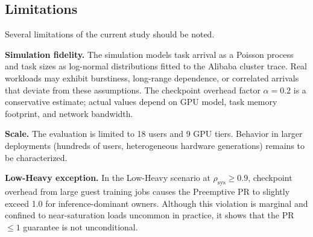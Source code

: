 \subsection{Limitations}
\label{sec:limitations}


Several limitations of the current study should be noted.


\textbf{Simulation fidelity.}
The simulation models task arrival as a Poisson process and task sizes
as log-normal distributions fitted to the Alibaba cluster trace.
Real workloads may exhibit burstiness, long-range dependence, or
correlated arrivals that deviate from these assumptions.
The checkpoint overhead factor $\alpha = 0.2$ is a conservative estimate;
actual values depend on GPU model, task memory footprint, and network bandwidth.


\textbf{Scale.}
The evaluation is limited to 18 users and 9 GPU tiers.
Behavior in larger deployments (hundreds of users, heterogeneous hardware
generations) remains to be characterized.


\textbf{Low-Heavy exception.}
In the Low-Heavy scenario at $\rho_\mathrm{sys} \geq 0.9$,
checkpoint overhead from large guest training jobs causes the Preemptive
PR to slightly exceed 1.0 for inference-dominant owners.
Although this violation is marginal and confined to near-saturation loads
uncommon in practice, it shows that the PR $\leq 1$ guarantee is not
unconditional.


